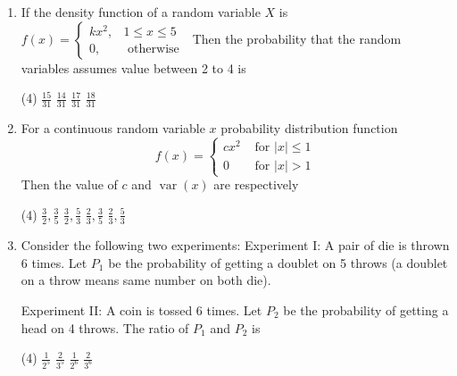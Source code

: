 \begin{enumerate}
	\begin{figure}[H]
		\centering
		\texttt{[image: P -assignment-01]}
	\end{figure}
	 \begin{tasks}(4)
		\task[\textbf{a.}]$\frac{1}{4}$
		\task[\textbf{b.}] $\frac{1}{8}$
		\task[\textbf{c.}]$\frac{1}{16}$
		\task[\textbf{d.}] $\frac{3}{16}$
	\end{tasks}
	\item If the density function of a random variable $X$ is $f(x)= \begin{cases}k x^{2}, & 1 \leq x \leq 5 \\ 0, & \text { otherwise }\end{cases}$
	Then the probability that the random variables assumes value between 2 to 4 is
	 \begin{tasks}(4)
		\task[\textbf{a.}]$\frac{15}{31}$
		\task[\textbf{b.}] $\frac{14}{31}$
		\task[\textbf{c.}]$\frac{17}{31}$
		\task[\textbf{d.}] $\frac{18}{31}$
	\end{tasks}
	\item For a continuous random variable $x$ probability distribution function
	$$
	f(x)= \begin{cases}c x^{2} & \text { for }|x| \leq 1 \\ 0 & \text { for }|x|>1\end{cases}
	$$
	Then the value of $c$ and $\operatorname{var}(x)$ are respectively
	 \begin{tasks}(4)
		\task[\textbf{a.}]$\frac{3}{2}, \frac{3}{5}$
		\task[\textbf{b.}] $\frac{3}{2}, \frac{5}{3}$
		\task[\textbf{c.}]$\frac{2}{3}, \frac{3}{5}$
		\task[\textbf{d.}] $\frac{2}{3}, \frac{5}{3}$
	\end{tasks}
	\item Consider the following two experiments:
	Experiment I: A pair of die is thrown 6 times. Let $P_{1}$ be the probability of getting a doublet on 5 throws (a doublet on a throw means same number on both die).
	
	Experiment II: A coin is tossed 6 times. Let $P_{2}$ be the probability of getting a head on 4 throws.
	The ratio of $P_{1}$ and $P_{2}$ is
	 \begin{tasks}(4)
		\task[\textbf{a.}]$\frac{1}{2^{5}}$
		\task[\textbf{b.}]$\frac{2}{3^{5}}$
		\task[\textbf{c.}]$\frac{1}{2^{6}}$
		\task[\textbf{d.}]$\frac{2}{3^{6}}$
	\end{tasks}
	
	
	
	
	
	
	
	
	
	
	
	
	
	
	
	
	
	
	
	
	
	
	
	
	
	
	
	
	
	
	
	
	
	
	
	
	
	
\end{enumerate}